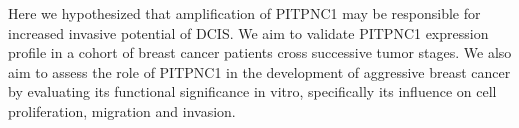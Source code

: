 \documentclass[10pt,letterpaper]{article}
\begin{document}
Here we hypothesized that amplification of PITPNC1 may be responsible for increased invasive potential of DCIS. We aim to validate PITPNC1 expression profile in a cohort of breast cancer patients cross successive tumor stages. We also aim to assess the role of PITPNC1 in the development of aggressive breast cancer by evaluating its functional significance in vitro, specifically its influence on cell proliferation, migration and invasion.

\printbibliography
\end{document}
